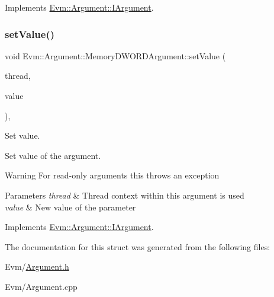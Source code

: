 Implements \mbox{\hyperlink{struct_evm_1_1_argument_1_1_i_argument_afcab2d2a1515518a111881a635c83da3}{Evm\+::\+Argument\+::\+I\+Argument}}.

\mbox{\label{struct_evm_1_1_argument_1_1_memory_d_w_o_r_d_argument_ad1b0d692889006c0db43740f099d8689}} 
\subsubsection{\texorpdfstring{set\+Value()}{setValue()}}
{\footnotesize\ttfamily void Evm\+::\+Argument\+::\+Memory\+D\+W\+O\+R\+D\+Argument\+::set\+Value (\begin{DoxyParamCaption}\item[{\mbox{\hyperlink{struct_evm_1_1_thread_context}{Thread\+Context}} \&}]{thread,  }\item[{uint64\+\_\+t}]{value }\end{DoxyParamCaption})\hspace{0.3cm}{\ttfamily [override]}, {\ttfamily [virtual]}}



Set value. 

Set value of the argument. \begin{DoxyWarning}{Warning}
For read-\/only arguments this throws an exception 
\end{DoxyWarning}

\begin{DoxyParams}{Parameters}
{\em thread} & Thread context within this argument is used \\
\hline
{\em value} & New value of the parameter \\
\hline
\end{DoxyParams}


Implements \mbox{\hyperlink{struct_evm_1_1_argument_1_1_i_argument_a24e4c76f2750e664e3895d2ff4b9146d}{Evm\+::\+Argument\+::\+I\+Argument}}.



The documentation for this struct was generated from the following files\+:\begin{DoxyCompactItemize}
\item 
Evm/\mbox{\hyperlink{_argument_8h}{Argument.\+h}}\item 
Evm/Argument.\+cpp\end{DoxyCompactItemize}
